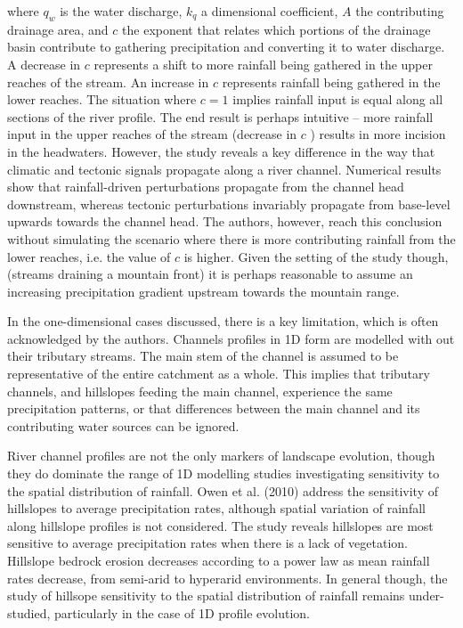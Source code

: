 \documentclass[12pt,oneside,PhD]{muthesis}
\begin{document}
where \(q_w\) is the water discharge, \(k_q\) a dimensional coefficient, \(A\) the contributing drainage area, and \(c\) the exponent that relates which portions of the drainage basin contribute to gathering precipitation and converting it to water discharge. A decrease in \(c\) represents a shift to more rainfall being gathered in the upper reaches of the stream. An increase in \(c\) represents rainfall being gathered in the lower reaches. The situation where \(c = 1\) implies rainfall input is equal along all sections of the river profile. The end result is perhaps intuitive -- more rainfall input in the upper reaches of the stream (decrease in \(c\) ) results in more incision in the headwaters. However, the study reveals a key difference in the way that climatic and tectonic signals propagate along a river channel. Numerical results show that rainfall-driven perturbations propagate from the channel head downstream, whereas tectonic perturbations invariably propagate from base-level upwards towards the channel head. The authors, however, reach this conclusion without simulating the scenario where there is more contributing rainfall from the lower reaches, i.e. the value of \(c\) is higher. Given the setting of the study though, (streams draining a mountain front) it is perhaps reasonable to assume an increasing precipitation gradient upstream towards the mountain range.

In the one-dimensional cases discussed, there is a key limitation, which is often acknowledged by the authors. Channels profiles in 1D form are modelled with out their tributary streams. The main stem of the channel is assumed to be representative of the entire catchment as a whole. This implies that tributary channels, and hillslopes feeding the main channel, experience the same precipitation patterns, or that differences between the main channel and its contributing water sources can be ignored. 

River channel profiles are not the only markers of landscape evolution, though they do dominate the range of 1D modelling studies investigating sensitivity to the spatial distribution of rainfall. Owen et al. (2010) address the sensitivity of hillslopes to average precipitation rates, although spatial variation of rainfall along hillslope profiles is not considered. The study reveals hillslopes are most sensitive to average precipitation rates when there is a lack of vegetation. Hillslope bedrock erosion decreases according to a power law as mean rainfall rates decrease, from semi-arid to hyperarid environments. In general though, the study of hillsope sensitivity to the spatial distribution of rainfall remains under-studied, particularly in the case of 1D profile evolution.
\end{document}
